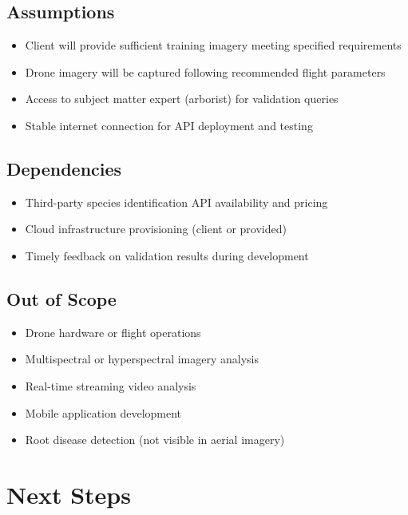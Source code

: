 \documentclass[11pt,a4paper]{article}
\begin{document}
\subsection{Assumptions}

\begin{itemize}[leftmargin=*]
\item Client will provide sufficient training imagery meeting specified requirements
\item Drone imagery will be captured following recommended flight parameters
\item Access to subject matter expert (arborist) for validation queries
\item Stable internet connection for API deployment and testing
\end{itemize}

\subsection{Dependencies}

\begin{itemize}[leftmargin=*]
\item Third-party species identification API availability and pricing
\item Cloud infrastructure provisioning (client or provided)
\item Timely feedback on validation results during development
\end{itemize}

\subsection{Out of Scope}

\begin{itemize}[leftmargin=*]
\item Drone hardware or flight operations
\item Multispectral or hyperspectral imagery analysis
\item Real-time streaming video analysis
\item Mobile application development
\item Root disease detection (not visible in aerial imagery)
\end{itemize}

\section{Next Steps}
\end{document}
